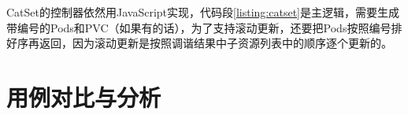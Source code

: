 \documentclass[macfonts,master]{njuthesis}
\begin{document}
CatSet的控制器依然用JavaScript实现，代码段\ref{listing:catset}是主逻辑，需要生成带编号的Pods和PVC（如果有的话），为了支持滚动更新，还要把Pods按照编号排好序再返回，因为滚动更新是按照调谐结果中子资源列表中的顺序逐个更新的。


%
%
%
%
%

\section{用例对比与分析}
\end{document}
